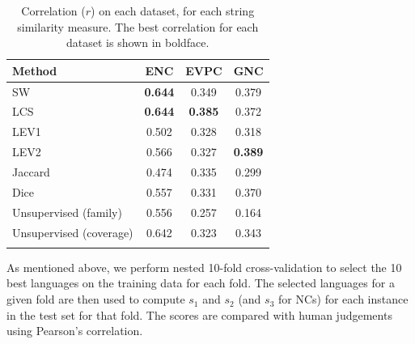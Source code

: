 \documentclass[output=paper,modfonts,nonflat]{langsci/langscibook}
\begin{document}

\begin{table}[t]
\begin{center}
\begin{tabular}{lccc}
\lsptoprule
Method  & ENC   & EVPC  & GNC   \\
\midrule
SW   & \textbf{0.644} & 0.349 & 0.379 \\
LCS  & \textbf{0.644} & \textbf{0.385} & 0.372 \\
LEV1 & 0.502 & 0.328 & 0.318 \\
LEV2 & 0.566 & 0.327 & \textbf{0.389} \\
Jaccard& 0.474 & 0.335 & 0.299\\
Dice & 0.557 & 0.331 & 0.370\\
\midrule
Unsupervised (family) & 0.556 & 0.257 & 0.164 \\
Unsupervised (coverage) & 0.642 & 0.323 & 0.343 \\
\lspbottomrule
\end{tabular}
\caption{Correlation ($r$) on each dataset, for
  each string similarity measure. The best correlation for each
  dataset is shown in boldface.}
\label{tab:stringsimresults}
\end{center}
\end{table}

As mentioned above, we perform nested 10-fold cross-validation to
select the 10 best languages on the training data for each fold. The
selected languages for a given fold are then used to compute $s_1$ and
$s_2$ (and $s_3$ for NCs) for each instance in the test set for that
fold.  The scores are compared with human judgements using Pearson's
correlation.  
\end{document}
